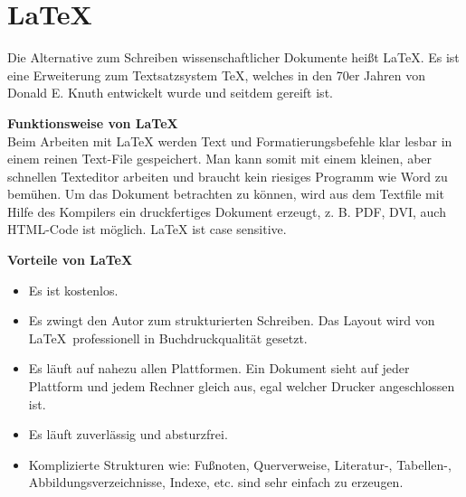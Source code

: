 \section{\LaTeX}
Die Alternative zum Schreiben wissenschaftlicher Dokumente heißt \LaTeX . Es ist eine Erweiterung zum Textsatzsystem \TeX, welches in den 70er Jahren von Donald E. Knuth entwickelt wurde und seitdem gereift ist.\vspace{6pt}

\textbf{Funktionsweise von \LaTeX}\\
Beim Arbeiten mit \LaTeX{} werden Text und Formatierungsbefehle klar lesbar in einem reinen Text-File gespeichert. Man kann somit mit einem kleinen, aber schnellen Texteditor arbeiten und braucht kein riesiges Programm wie Word zu bemühen. Um das Dokument betrachten zu können, wird aus dem Textfile mit Hilfe des Kompilers ein druckfertiges Dokument erzeugt, z. B. PDF, DVI, auch HTML-Code ist möglich. \LaTeX{} ist case sensitive.\vspace{6pt}

\textbf{Vorteile von \LaTeX}
\begin{itemize}
	\item Es ist kostenlos.
	\item Es zwingt den Autor zum strukturierten Schreiben. Das Layout wird von \LaTeX\, professionell in Buchdruckqualität gesetzt.
	\item Es läuft auf nahezu allen Plattformen. Ein Dokument sieht auf jeder Plattform und jedem Rechner gleich aus, egal welcher Drucker angeschlossen ist.
	\item Es läuft zuverlässig und absturzfrei.
	\item Komplizierte Strukturen wie: Fußnoten, Querverweise, Literatur-, Tabellen-, Abbildungsverzeichnisse, Indexe, etc. sind sehr einfach zu erzeugen.
\end{itemize}

